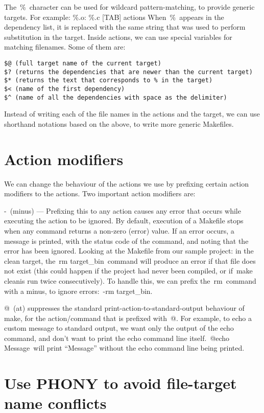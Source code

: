 \documentclass[output=paper, 
colorlinks,
citecolor=brown,
newtxmath
]{langscibook}
\begin{document}
The \% character can be used for wildcard pattern-matching, to provide generic targets. For example:
\%.o: \%.c
[TAB] actions
When \% appears in the dependency list, it is replaced with the same string that was used to perform substitution in the target.
Inside actions, we can use special variables for matching filenames. Some of them are:

\begin{verbatim}
$@ (full target name of the current target)
$? (returns the dependencies that are newer than the current target)
$* (returns the text that corresponds to % in the target)
$< (name of the first dependency)
$^ (name of all the dependencies with space as the delimiter)
\end{verbatim}

Instead of writing each of the file names in the actions and the target, we can use shorthand notations based on the above, to write more generic Makefiles.

\section {Action modifiers}

We can change the behaviour of the actions we use by prefixing certain action modifiers to the actions. Two important action modifiers are:

- (minus) — Prefixing this to any action causes any error that occurs while executing the action to be ignored. By default, execution of a Makefile stops when any command returns a non-zero (error) value. If an error occurs, a message is printed, with the status code of the command, and noting that the error has been ignored. Looking at the Makefile from our sample project: in the clean target, the rm target\_bin command will produce an error if that file does not exist (this could happen if the project had never been compiled, or if make cleanis run twice consecutively). To handle this, we can prefix the rm command with a minus, to ignore errors: -rm target\_bin.

@ (at) suppresses the standard print-action-to-standard-output behaviour of make, for the action/command that is prefixed with @. For example, to echo a custom message to standard output, we want only the output of the echo command, and don’t want to print the echo command line itself. @echo Message will print “Message” without the echo command line being printed.

\section {Use PHONY to avoid file-target name conflicts}
\end{document}
